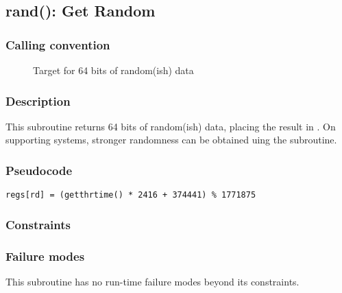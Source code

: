 \clearpage
{}
{}
\label{insn:and}
\subsection*{rand(): Get Random}

\subsubsection*{Calling convention}

\begin{description}
\item[] Target for 64 bits of random(ish) data
\end{description}

\subsubsection*{Description}

This subroutine returns 64 bits of random(ish) data, placing the result in
.
On supporting systems, stronger randomness can be obtained uing the
\hyperref[subr:random]{} subroutine.

\subsubsection*{Pseudocode}

\begin{verbatim}
regs[rd] = (getthrtime() * 2416 + 374441) % 1771875
\end{verbatim}

\subsubsection*{Constraints}

\subsubsection*{Failure modes}

This subroutine has no run-time failure modes beyond its constraints.
